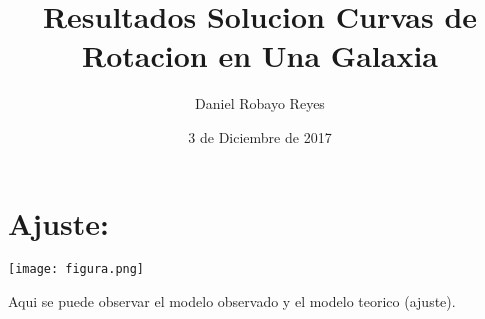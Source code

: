 \documentclass[12pt]{article}
\author{Daniel Robayo Reyes}
\date{3 de Diciembre de 2017}
\title{Resultados Solucion Curvas de Rotacion en Una Galaxia}
\begin{document}
\maketitle
\section{Ajuste:}


\texttt{[image: figura.png]}

Aqui se puede observar el modelo observado y el modelo teorico (ajuste).
\end{document}
